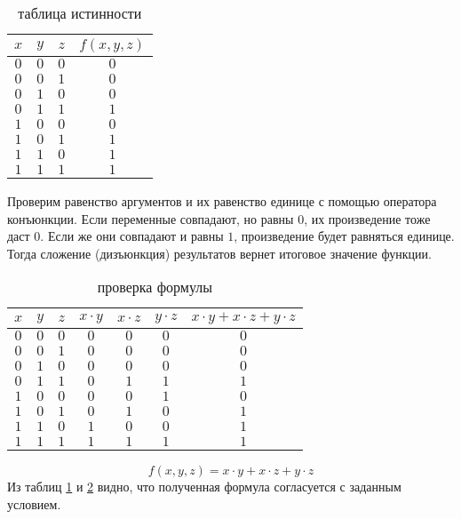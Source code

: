 \documentclass[12pt]{article}
\begin{document}
\begin{enumerate}[label={\textbf{\arabic{section}.\arabic*}}]
		\begin{table}[h]
			\centering
			\begin{tabular}{|c|c|c|c|} \hline
				$x$ & $y$ & $z$ & $f(x,y,z)$  \\ \hline
				$0$ & $0$ & $0$ & $0$ \\
				$0$ & $0$ & $1$ & $0$ \\
				$0$ & $1$ & $0$ & $0$ \\
				$0$ & $1$ & $1$ & $1$ \\
				$1$ & $0$ & $0$ & $0$ \\
				$1$ & $0$ & $1$ & $1$ \\
				$1$ & $1$ & $0$ & $1$ \\
				$1$ & $1$ & $1$ & $1$ \\ \hline
			\end{tabular}
			\caption{таблица истинности}
			\label{table1.6.1}
		\end{table}
		Проверим равенство аргументов и их равенство единице с помощью оператора конъюнкции. Если переменные совпадают, но равны $0$, их произведение тоже даст $0$. Если же они совпадают и равны $1$, произведение будет равняться единице. Тогда сложение (дизъюнкция) результатов вернет итоговое значение функции.
		\begin{table}[h]
			\centering
			\begin{tabular}{|c|c|c|c|c|c|c|} \hline
				$x$ & $y$ & $z$ & $x\cdot y$ & $x\cdot z$ & $y\cdot z$ & $x\cdot y + x\cdot z + y\cdot z$  \\ \hline
				$0$ & $0$ & $0$ & $0$ & $0$ & $0$ & $0$ \\
				$0$ & $0$ & $1$ & $0$ & $0$ & $0$ & $0$ \\
				$0$ & $1$ & $0$ & $0$ & $0$ & $0$ & $0$ \\
				$0$ & $1$ & $1$ & $0$ & $1$ & $1$ & $1$ \\
				$1$ & $0$ & $0$ & $0$ & $0$ & $1$ & $0$ \\
				$1$ & $0$ & $1$ & $0$ & $1$ & $0$ & $1$ \\
				$1$ & $1$ & $0$ & $1$ & $0$ & $0$ & $1$ \\
				$1$ & $1$ & $1$ & $1$ & $1$ & $1$ & $1$ \\ \hline
			\end{tabular}
			\caption{проверка формулы}
			\label{table1.6.2}
		\end{table}
		$$
		f(x,y,z) = x\cdot y + x\cdot z + y\cdot z
		$$
		Из таблиц \ref{table1.6.1} и \ref{table1.6.2} видно, что полученная формула согласуется с заданным условием.
		

\end{enumerate}
\end{document}

